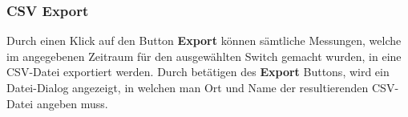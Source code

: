 \subsubsection{CSV Export}
Durch einen Klick auf den Button \textbf{Export} können sämtliche Messungen, welche im angegebenen Zeitraum für den ausgewählten Switch gemacht wurden, in eine CSV-Datei exportiert werden. Durch betätigen des \textbf{Export} Buttons, wird ein Datei-Dialog angezeigt, in welchen man Ort und Name der resultierenden CSV-Datei angeben muss.
